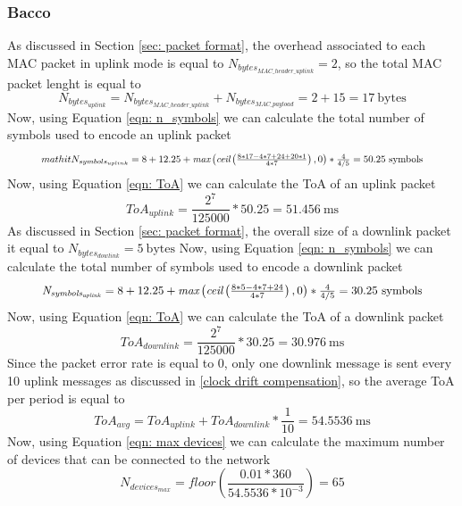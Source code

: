 \subsubsection{Bacco}
As discussed in Section \ref{sec: packet format}, the overhead associated to each \gls{MAC} packet in uplink mode is
equal to $\mathit{N_{bytes_{MAC\_header\_uplink}}} = 2$, so the total \gls{MAC} packet lenght is equal to
$$\mathit{N_{bytes_{uplink}}} = \mathit{N_{bytes_{MAC\_header\_uplink}}} + \mathit{N_{bytes_{MAC\_payload}}} = 2 + 15 =
17\ \mathrm{bytes}$$
Now, using Equation \ref{eqn: n_symbols} we can calculate the total number of symbols used to encode an uplink packet
\begin{equation*}
    \resizebox{.9\hsize}{!}{
        \ensuremath{mathit{N_{symbols_{uplink}}} = 8 + 12.25 + \textit{max} \left ( \textit{ceil} \left ( \frac{8 * 17 - 4 * 7 + 24 +
        20 * 1}{4 * 7} \right ), 0 \right ) * \frac{4}{4/5} = 50.25\ \mathrm{symbols}}
    }
\end{equation*}
Now, using Equation \ref{eqn: ToA} we can calculate the \gls{ToA} of an uplink packet
$$\mathit{ToA_{uplink}} = \frac{2^7}{125000} * 50.25 = 51.456\ \mathrm{ms}$$
As discussed in Section \ref{sec: packet format}, the overall size of a downlink packet it equal to
$\mathit{N_{bytes_{dowlink}}} = 5\ \mathrm{bytes}$
Now, using Equation \ref{eqn: n_symbols} we can calculate the total number of symbols used to encode a downlink packet
\begin{equation*}
    \resizebox{.9\hsize}{!}{
        \ensuremath{
        \mathit{N_{symbols_{uplink}}} = 8 + 12.25 + \textit{max} \left ( \textit{ceil} \left ( \frac{8 * 5 - 4 * 7 +
    24}{4 * 7} \right ), 0 \right ) * \frac{4}{4/5} = 30.25\ \mathrm{symbols}}
    }
\end{equation*}
Now, using Equation \ref{eqn: ToA} we can calculate the \gls{ToA} of a downlink packet
$$\mathit{ToA_{downlink}} = \frac{2^7}{125000} * 30.25 = 30.976\ \mathrm{ms}$$
Since the packet error rate is equal to 0, only one downlink message is sent every 10 uplink messages as discussed in
\ref{clock drift compensation}, so the average \gls{ToA} per period is equal to
$$\mathit{ToA_{avg}} = \mathit{ToA_{uplink}} + \mathit{ToA_{downlink}} * \frac{1}{10} = 54.5536\ \mathrm{ms}$$
Now, using Equation \ref{eqn: max devices} we can calculate the maximum number of devices that can be connected to the
network
$$\mathit{N_{devices_{max}}} = \textit{floor} \left( \frac{0.01 * 360}{54.5536 * 10^{-3}} \right) = 65$$

